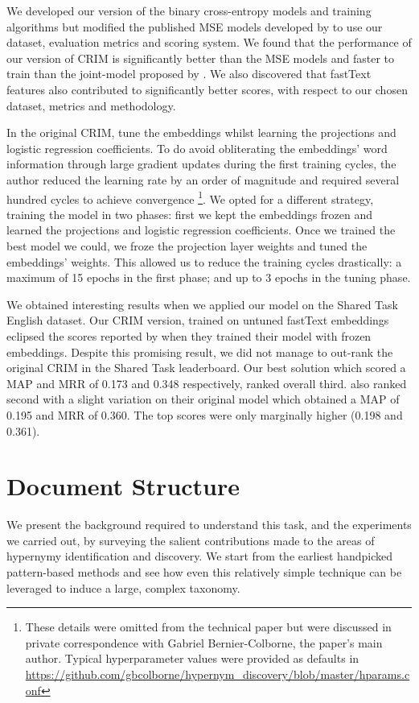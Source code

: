 We developed our version of the binary cross-entropy models and training algorithms but modified the published \ac{MSE} models developed by \citeauthor{ustalov2017negative} to use our dataset, evaluation metrics and scoring system.  We found that the performance of our version of CRIM is significantly better than the \ac{MSE} models and faster to train than the joint-model proposed by \citet{yamane2016distributional}.  We also discovered that fastText features also contributed to significantly better scores, with respect to our chosen dataset, metrics and methodology.

In the original CRIM, \citet{bernier2018crim} tune the embeddings whilst learning the projections and logistic regression coefficients.  To do avoid obliterating the embeddings' word information through large gradient updates during the first training cycles, the author reduced the learning rate by an order of magnitude and required several hundred cycles to achieve convergence \footnote{These details were omitted from the technical paper but were discussed in private correspondence with Gabriel Bernier-Colborne, the paper's main author.  Typical hyperparameter values were provided as defaults in \url{https://github.com/gbcolborne/hypernym_discovery/blob/master/hparams.conf}}.  We opted for a different strategy, training the model in two phases: first we kept the embeddings frozen and learned the projections and logistic regression coefficients.  Once we trained the best model we could, we froze the projection layer weights and tuned the embeddings' weights.  This allowed us to reduce the training cycles drastically: a maximum of 15 epochs in the first phase; and up to 3 epochs in the tuning phase.  

We obtained interesting results when we applied our model on the Shared Task English dataset. Our CRIM version, trained on untuned fastText embeddings eclipsed the scores reported by \citet{bernier2018crim} when they trained their model with frozen embeddings.  Despite this promising result, we did not manage to out-rank the original CRIM in the Shared Task leaderboard.  Our best solution which scored a \ac{MAP} and \ac{MRR} of 0.173 and 0.348 respectively, ranked overall third.
\citeauthor{bernier2018crim} also ranked second with a slight variation on their original model which obtained a \ac{MAP} of 0.195 and \ac{MRR} of 0.360.  The top scores were only marginally higher (0.198 and 0.361).

\section{Document Structure}
We present the background required to understand this task, and the experiments we carried out, by surveying the salient contributions made to the areas of hypernymy identification and discovery.   We start from the earliest handpicked pattern-based methods and see how even this relatively simple technique can be leveraged to induce a large, complex taxonomy.  

